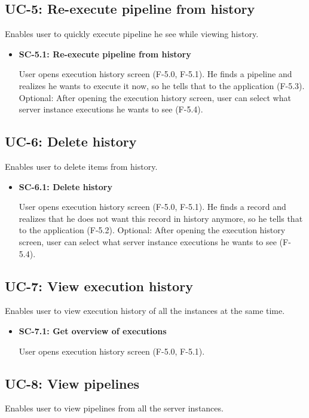 \subsection*{UC-5: Re-execute pipeline from history}
Enables user to quickly execute pipeline he see while viewing history.

\begin{itemize}
\item \textbf{SC-5.1: Re-execute pipeline from history}

User opens execution history screen (F-5.0, F-5.1). He finds a pipeline and realizes he wants to execute it now, so he tells that to the application (F-5.3). Optional: After opening the execution history screen, user can select what server instance executions he wants to see (F-5.4).
\end{itemize}


\subsection*{UC-6: Delete history}
Enables user to delete items from history.

\begin{itemize}
\item \textbf{SC-6.1: Delete history}

User opens execution history screen (F-5.0, F-5.1). He finds a record and realizes that he does not want this record in history anymore, so he tells that to the application (F-5.2). Optional: After opening the execution history screen, user can select what server instance executions he wants to see (F-5.4).
\end{itemize}


\subsection*{UC-7: View execution history}
Enables user to view execution history of all the instances at the same time.

\begin{itemize}
\item \textbf{SC-7.1: Get overview of executions}

User opens execution history screen (F-5.0, F-5.1).
\end{itemize}


\subsection*{UC-8: View pipelines}
Enables user to view pipelines from all the server instances.

